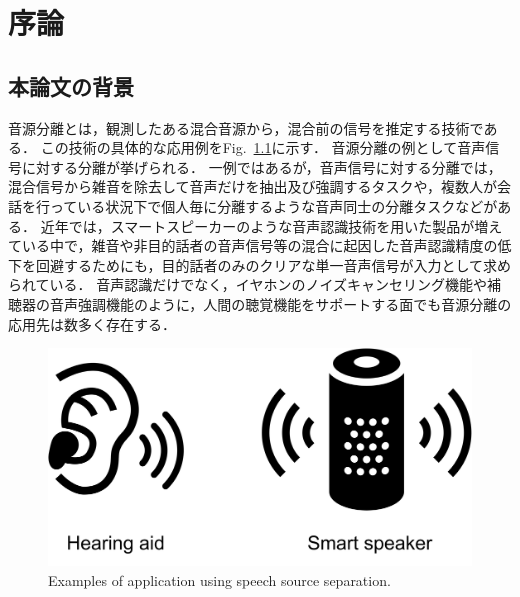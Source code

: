 \chapter{序論}
\label{chap:intro}

\section{本論文の背景}

音源分離とは，観測したある混合音源から，混合前の信号を推定する技術である．
この技術の具体的な応用例をFig.~\ref{fig:apps}に示す．
音源分離の例として音声信号に対する分離が挙げられる．
一例ではあるが，音声信号に対する分離では，混合信号から雑音を除去して音声だけを抽出及び強調するタスクや，複数人が会話を行っている状況下で個人毎に分離するような音声同士の分離タスクなどがある．
近年では，スマートスピーカーのような音声認識技術を用いた製品が増えている中で，雑音や非目的話者の音声信号等の混合に起因した音声認識精度の低下を回避するためにも，目的話者のみのクリアな単一音声信号が入力として求められている．
音声認識だけでなく，イヤホンのノイズキャンセリング機能や補聴器の音声強調機能のように，人間の聴覚機能をサポートする面でも音源分離の応用先は数多く存在する．
\begin{figure}[t]
    \vspace{4pt}
    \begin{center}
        \includegraphics[width=0.7\columnwidth]{figures/using_audio_sep.pdf}
    \end{center}
    \vspace{-8pt}
	\caption{Examples of application using speech source separation.}
	\label{fig:apps}
\end{figure}


